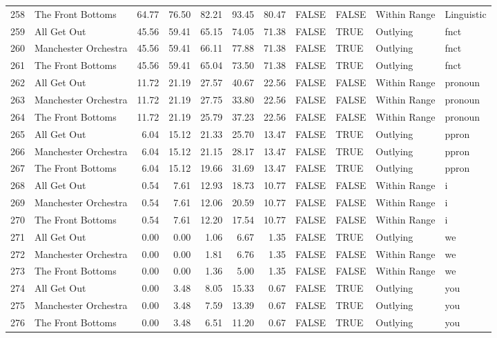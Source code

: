 \begin{table}[ht]
\begin{tabular}{rlrrrrrllll}
  258 & The Front Bottoms & 64.77 & 76.50 & 82.21 & 93.45 & 80.47 & FALSE & FALSE & Within Range & Linguistic \\ 
  259 & All Get Out & 45.56 & 59.41 & 65.15 & 74.05 & 71.38 & FALSE & TRUE & Outlying & fnct \\ 
  260 & Manchester Orchestra & 45.56 & 59.41 & 66.11 & 77.88 & 71.38 & FALSE & TRUE & Outlying & fnct \\ 
  261 & The Front Bottoms & 45.56 & 59.41 & 65.04 & 73.50 & 71.38 & FALSE & TRUE & Outlying & fnct \\ 
  262 & All Get Out & 11.72 & 21.19 & 27.57 & 40.67 & 22.56 & FALSE & FALSE & Within Range & pronoun \\ 
  263 & Manchester Orchestra & 11.72 & 21.19 & 27.75 & 33.80 & 22.56 & FALSE & FALSE & Within Range & pronoun \\ 
  264 & The Front Bottoms & 11.72 & 21.19 & 25.79 & 37.23 & 22.56 & FALSE & FALSE & Within Range & pronoun \\ 
  265 & All Get Out & 6.04 & 15.12 & 21.33 & 25.70 & 13.47 & FALSE & TRUE & Outlying & ppron \\ 
  266 & Manchester Orchestra & 6.04 & 15.12 & 21.15 & 28.17 & 13.47 & FALSE & TRUE & Outlying & ppron \\ 
  267 & The Front Bottoms & 6.04 & 15.12 & 19.66 & 31.69 & 13.47 & FALSE & TRUE & Outlying & ppron \\ 
  268 & All Get Out & 0.54 & 7.61 & 12.93 & 18.73 & 10.77 & FALSE & FALSE & Within Range & i \\ 
  269 & Manchester Orchestra & 0.54 & 7.61 & 12.06 & 20.59 & 10.77 & FALSE & FALSE & Within Range & i \\ 
  270 & The Front Bottoms & 0.54 & 7.61 & 12.20 & 17.54 & 10.77 & FALSE & FALSE & Within Range & i \\ 
  271 & All Get Out & 0.00 & 0.00 & 1.06 & 6.67 & 1.35 & FALSE & TRUE & Outlying & we \\ 
  272 & Manchester Orchestra & 0.00 & 0.00 & 1.81 & 6.76 & 1.35 & FALSE & FALSE & Within Range & we \\ 
  273 & The Front Bottoms & 0.00 & 0.00 & 1.36 & 5.00 & 1.35 & FALSE & FALSE & Within Range & we \\ 
  274 & All Get Out & 0.00 & 3.48 & 8.05 & 15.33 & 0.67 & FALSE & TRUE & Outlying & you \\ 
  275 & Manchester Orchestra & 0.00 & 3.48 & 7.59 & 13.39 & 0.67 & FALSE & TRUE & Outlying & you \\ 
  276 & The Front Bottoms & 0.00 & 3.48 & 6.51 & 11.20 & 0.67 & FALSE & TRUE & Outlying & you \\ 

\end{tabular}
\end{table}
